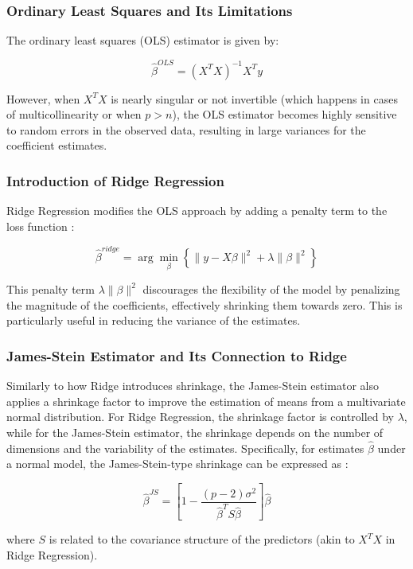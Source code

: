 \subsubsection{Ordinary Least Squares and Its Limitations}

The ordinary least squares (OLS) estimator is given by:

\begin{equation}
    \hat{\beta}^{OLS} = (X^TX)^{-1}X^Ty
\end{equation}

However, when \( X^TX \) is nearly singular or not invertible (which happens in cases of multicollinearity or when \( p > n \)), the OLS estimator becomes highly sensitive to random errors in the observed data, resulting in large variances for the coefficient estimates.

\subsubsection{Introduction of Ridge Regression}

Ridge Regression modifies the OLS approach by adding a penalty term to the loss function \cite{hastie2020ridge,james2013introduction,hastie2009elements}:

\begin{equation}
    \hat{\beta}^{ridge} = \arg\min_\beta \left\{ \|y - X\beta\|^2 + \lambda \|\beta\|^2 \right\}
\end{equation}

This penalty term \( \lambda \|\beta\|^2 \) discourages the flexibility of the model by penalizing the magnitude of the coefficients, effectively shrinking them towards zero. This is particularly useful in reducing the variance of the estimates.

\subsubsection{James-Stein Estimator and Its Connection to Ridge}

Similarly to how Ridge introduces shrinkage, the James-Stein estimator also applies a shrinkage factor to improve the estimation of means from a multivariate normal distribution. For Ridge Regression, the shrinkage factor is controlled by \( \lambda \), while for the James-Stein estimator, the shrinkage depends on the number of dimensions and the variability of the estimates. Specifically, for estimates \( \hat{\beta} \) under a normal model, the James-Stein-type shrinkage can be expressed as \cite{efron2021computer}:

\begin{equation}
    \hat{\beta}^{JS} = \left[ 1 - \frac{(p-2)\sigma^2}{\hat{\beta}^T S \hat{\beta}} \right] \hat{\beta}
\end{equation}

where \( S \) is related to the covariance structure of the predictors (akin to \( X^TX \) in Ridge Regression).